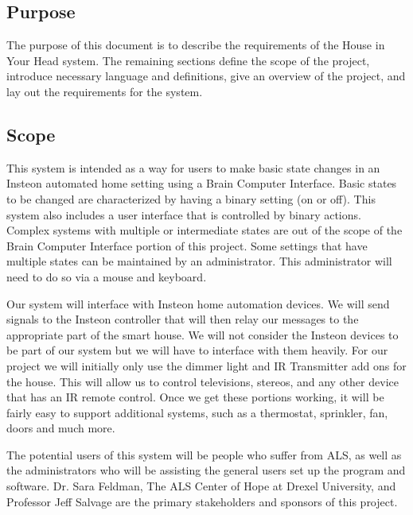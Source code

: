 \documentclass{article}
\begin{document}
\subsection{Purpose}

The purpose of this document is to describe the requirements of the House in
Your Head system. The remaining sections define the scope of the project,
introduce necessary language and definitions, give an overview of the project,
and lay out the requirements for the system.

\subsection{Scope}


This system is intended as a way for users to make basic state changes in an
Insteon automated home setting using a Brain Computer Interface. Basic states to be
changed are characterized by having a binary setting (on or off). This system
also includes a user interface that is controlled by binary actions. Complex
systems with multiple or intermediate states are out of the scope of the Brain
Computer Interface portion of this project. Some settings that have multiple
states can be maintained by an administrator. This administrator will need to
do so via a mouse and keyboard. 

Our system will interface with Insteon home automation devices. We will send signals to the Insteon controller that will then relay our messages to the appropriate part of the smart house. We will not consider the Insteon devices to be part of our system but we will have to interface with them heavily. For our project we will initially only use the dimmer light and IR Transmitter add ons for the house. This will allow us to control televisions, stereos, and any other device that has an IR remote control. Once we get these portions working, it will be fairly easy to support additional systems, such as a thermostat, sprinkler, fan, doors and much more.


The potential users of this system will be people who suffer from ALS, as well
as the administrators who will be assisting the general users set up the
program and software. Dr. Sara Feldman, The ALS Center of Hope at Drexel
University, and Professor Jeff Salvage are the primary stakeholders and
sponsors of this project.
\end{document}
